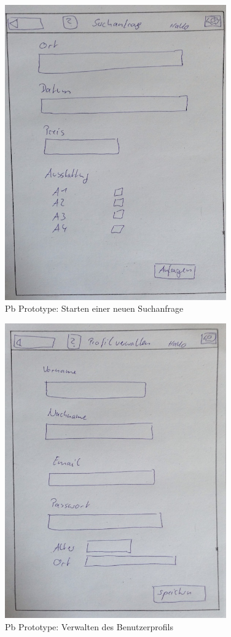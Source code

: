 \begin{figure}[H]
\centering
\includegraphics[angle=90, width=0.85\textwidth]{./images/paperbased/suchanfrage.JPG}
\caption{Pb Prototype: Starten einer neuen Suchanfrage}
\label{pbprototype13}
\end{figure}

\begin{figure}[H]
\centering
\includegraphics[angle=90, width=0.85\textwidth]{./images/paperbased/verwalten.JPG}
\caption{Pb Prototype: Verwalten des Benutzerprofils}
\label{pbprototype14}
\end{figure}

